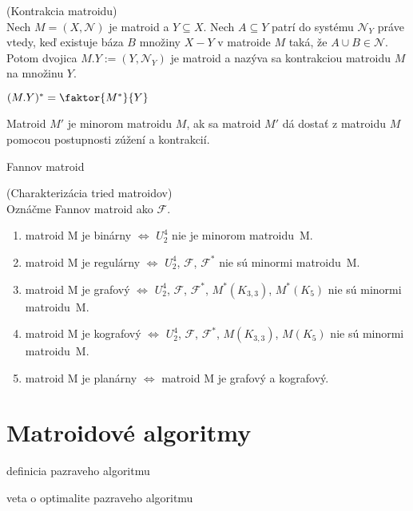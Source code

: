 \begin{definition}{(Kontrakcia matroidu)}\\
Nech $M = (X, \mathcal{N})$ je matroid a $Y \subseteq X$. 
Nech $A \subseteq Y$ patrí do systému $\mathcal{N}_Y$ práve vtedy, keď existuje 
báza $B$ množiny $X-Y$ v matroide $M$ taká, že $A \cup B \in \mathcal{N}$. Potom dvojica
$M.Y := (Y, \mathcal{N}_Y)$ je matroid a nazýva sa kontrakciou matroidu $M$ na množinu $Y$.
\end{definition}

\begin{theorem}
$(M.Y)^* = \faktor{M^*}{Y}$
\end{theorem}

\begin{definition}
Matroid $M'$ je minorom matroidu $M$, ak sa matroid $M'$ dá dostať z matroidu $M$ pomocou postupnosti zúžení a kontrakcií.
\end{definition}

\TODO Fannov matroid

\begin{theorem_hard}{(Charakterizácia tried matroidov)}\\

Oznáčme Fannov matroid ako $\mathcal{F}$.

\begin{enumerate}
    \item matroid M je binárny $\Longleftrightarrow$ $U_2^4$ nie je minorom matroidu~M.
    \item matroid M je regulárny $\Longleftrightarrow$ $U_2^4$, $\mathcal{F}$, $\mathcal{F}^*$ nie sú minormi matroidu~M.
    \item matroid M je grafový $\Longleftrightarrow$ $U_2^4$, $\mathcal{F}$, $\mathcal{F}^*$, $M^*(K_{3,3})$, $M^*(K_{5})$ nie sú minormi matroidu~M.
    \item matroid M je kografový $\Longleftrightarrow$ $U_2^4$, $\mathcal{F}$, $\mathcal{F}^*$, $M(K_{3,3})$, $M(K_{5})$ nie sú minormi matroidu~M.
    \item matroid M je planárny $\Longleftrightarrow$ matroid M je grafový a kografový.
\end{enumerate}
\end{theorem_hard}


\section{Matroidové algoritmy}

\TODO definicia pazraveho algoritmu

\TODO veta o optimalite pazraveho algoritmu
